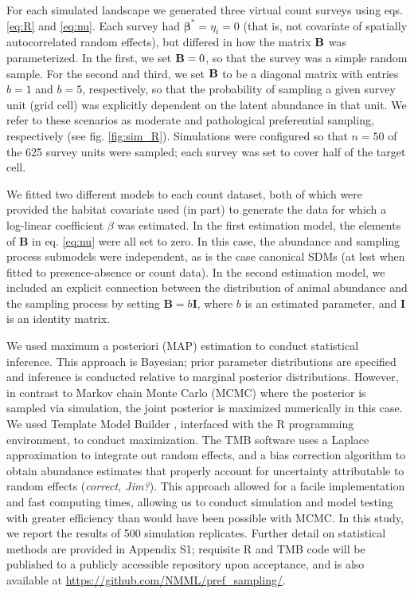 \documentclass[times,mee,doublespace,]{besauth2}
\begin{document}
For each simulated landscape we generated three virtual count surveys using eqs. \ref{eq:R} and \ref{eq:nu}.  Each survey had $\boldsymbol{\beta}^*=\eta_i=0$ (that is, not covariate of spatially autocorrelated random effects), but differed in how the matrix ${\bf B}$ was parameterized.  In the first, we set ${\bf B}=0$, so that the survey was a simple random sample.  For the second and third, we set ${\bf B}$ to be a diagonal matrix with entries $b=1$ and $b=5$, respectively, so that the probability of sampling a given survey unit (grid cell) was explicitly dependent on the latent abundance in that unit.  We refer to these scenarios as moderate and pathological preferential sampling, respectively (see fig. \ref{fig:sim_R}).  Simulations were configured so that $n=50$ of the 625 survey units were sampled; each survey was set to cover half of the target cell.

We fitted two different models to each count dataset, both of which were provided the habitat covariate used (in part) to generate the data for which a log-linear coefficient $\beta$ was estimated.  In the first estimation model, the elements of \textbf{B} in eq. \ref{eq:nu} were all set to zero.  In this case, the abundance and sampling process submodels were independent, as is the case canonical SDMs (at lest when fitted to presence-absence or count data).  In the second estimation model, we included an explicit connection between the distribution of animal abundance and the sampling process by setting $\textbf{B}=b\textbf{I}$, where $b$ is an estimated parameter, and \textbf{I} is an identity matrix.

We used maximum a posteriori (MAP) estimation to conduct statistical inference. This approach is Bayesian; prior parameter distributions are specified and inference is conducted relative to marginal posterior distributions. However, in contrast to Markov chain Monte Carlo (MCMC) where the posterior is sampled via simulation, the joint posterior is maximized numerically in this case.  We used Template Model Builder \citep[TMB; ][]{KristensenEtAl2015}, interfaced with the R programming environment, to conduct maximization. The TMB software uses a Laplace approximation to integrate out random effects, and a bias correction algorithm \citep{Tierney1989} to obtain abundance estimates that properly account for uncertainty attributable to random effects (\textit{correct, Jim?}).  This approach allowed for a facile implementation and fast computing times, allowing us to conduct simulation and model testing with greater efficiency than would have been possible with MCMC.  In this study, we report the results of 500 simulation replicates.  Further detail on statistical methods are provided in Appendix S1; requisite R and TMB code will be published to a publicly accessible repository upon acceptance, and is also available at \url{https://github.com/NMML/pref_sampling/}.
\end{document}

